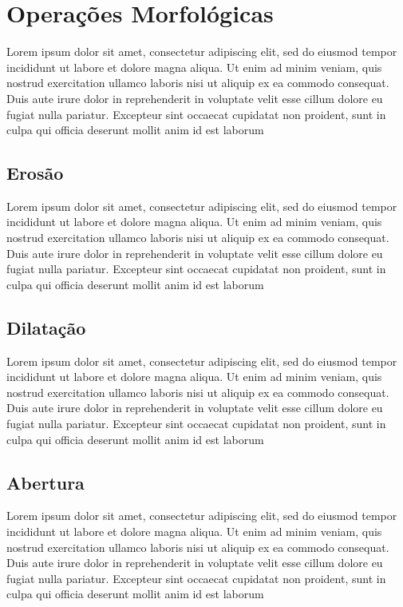 \section{Operações Morfológicas}
\label{sec:morfologicas}

Lorem ipsum dolor sit amet, consectetur adipiscing elit, sed do eiusmod tempor incididunt ut labore et dolore magna aliqua. Ut enim ad minim veniam, quis nostrud exercitation ullamco laboris nisi ut aliquip ex ea commodo consequat. Duis aute irure dolor in reprehenderit in voluptate velit esse cillum dolore eu fugiat nulla pariatur. Excepteur sint occaecat cupidatat non proident, sunt in culpa qui officia deserunt mollit anim id est laborum

\subsection{Erosão}
\label{sec:erosao}

Lorem ipsum dolor sit amet, consectetur adipiscing elit, sed do eiusmod tempor incididunt ut labore et dolore magna aliqua. Ut enim ad minim veniam, quis nostrud exercitation ullamco laboris nisi ut aliquip ex ea commodo consequat. Duis aute irure dolor in reprehenderit in voluptate velit esse cillum dolore eu fugiat nulla pariatur. Excepteur sint occaecat cupidatat non proident, sunt in culpa qui officia deserunt mollit anim id est laborum

\subsection{Dilatação}
\label{sec:dilatacao}

Lorem ipsum dolor sit amet, consectetur adipiscing elit, sed do eiusmod tempor incididunt ut labore et dolore magna aliqua. Ut enim ad minim veniam, quis nostrud exercitation ullamco laboris nisi ut aliquip ex ea commodo consequat. Duis aute irure dolor in reprehenderit in voluptate velit esse cillum dolore eu fugiat nulla pariatur. Excepteur sint occaecat cupidatat non proident, sunt in culpa qui officia deserunt mollit anim id est laborum

\subsection{Abertura}
\label{sec:abertura}

Lorem ipsum dolor sit amet, consectetur adipiscing elit, sed do eiusmod tempor incididunt ut labore et dolore magna aliqua. Ut enim ad minim veniam, quis nostrud exercitation ullamco laboris nisi ut aliquip ex ea commodo consequat. Duis aute irure dolor in reprehenderit in voluptate velit esse cillum dolore eu fugiat nulla pariatur. Excepteur sint occaecat cupidatat non proident, sunt in culpa qui officia deserunt mollit anim id est laborum

